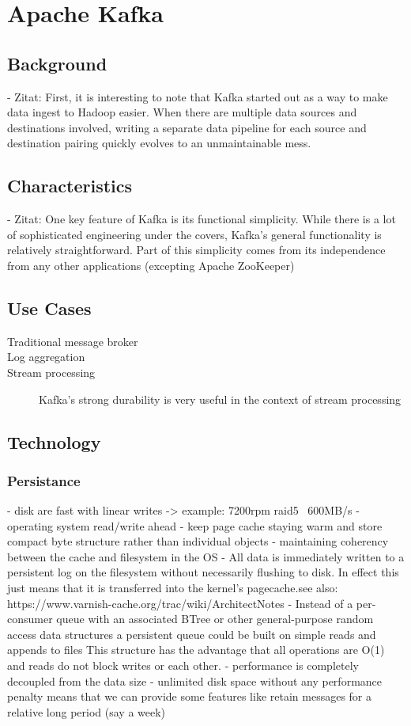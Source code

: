 \chapter{Apache Kafka}
\section{Background}

- Zitat: First, it is interesting to note that Kafka started out as a way to
make data ingest to Hadoop easier. When there are multiple data sources and
destinations involved, writing a separate data pipeline for each source and
destination pairing quickly evolves to an unmaintainable mess.
\section{Characteristics}
- Zitat: One key feature of Kafka is its functional simplicity. While there is a
lot of sophisticated engineering under the covers, Kafka’s general functionality
is relatively straightforward. Part of this simplicity comes from its
independence from any other applications (excepting Apache ZooKeeper)

\section{Use Cases}
\begin{description}
    \item [Traditional message broker]
    \item [Log aggregation]
    \item [Stream processing] Kafka's strong durability is very useful in the
        context of stream processing
\end{description}
\section{Technology}

\subsection{Persistance}
- disk are fast with linear writes -> example: 7200rpm raid5 ~600MB/s
- operating system read/write ahead
- keep page cache staying warm and store compact byte structure rather than individual objects
- maintaining coherency between the cache and filesystem in the OS
- All data is immediately written to a persistent log on the filesystem without necessarily flushing to disk. In effect this just means that it is transferred into the kernel's pagecache.see also: https://www.varnish-cache.org/trac/wiki/ArchitectNotes
- Instead of  a per-consumer queue with an associated BTree or other general-purpose random access data structures
  a persistent queue could be built on simple reads and appends to files
  This structure has the advantage that all operations are O(1) and reads do not block writes or each other.
- performance is completely decoupled from the data size
- unlimited disk space without any performance penalty means that we can provide some features like retain messages for a relative long period (say a week)

